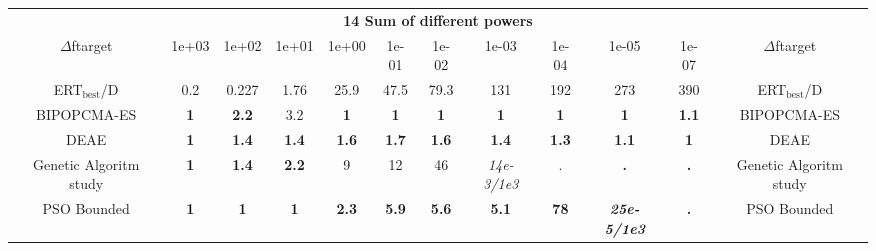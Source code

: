 \begin{tabular}{cccccccccccc}
 & \multicolumn{10}{c}{{\normalsize \textbf{14 Sum of different powers}}}\\
$\Delta$ftarget& 1e+03& 1e+02& 1e+01& 1e+00& 1e-01& 1e-02& 1e-03& 1e-04& 1e-05& 1e-07 & $\Delta$ftarget \\
ERT$_{\textrm{best}}$/D& 0.2& 0.227& 1.76& 25.9& 47.5& 79.3& 131& 192& 273& 390 & ERT$_{\textrm{best}}$/D \\
\hline
BIPOPCMA-ES & \textbf{1} & \textbf{2.2} & 3.2 & \textbf{1} & \textbf{1} & \textbf{1} & \textbf{1} & \textbf{1} & \textbf{1} & \textbf{1.1} & BIPOPCMA-ES \cite{add_an_entry_for_BIPOPCMA-ES_in_bbob.bib}\\
DEAE & \textbf{1} & \textbf{1.4} & \textbf{1.4} & \textbf{1.6} & \textbf{1.7} & \textbf{1.6} & \textbf{1.4} & \textbf{1.3} & \textbf{1.1} & \textbf{1} & DEAE \cite{add_an_entry_for_DEAE_in_bbob.bib}\\
Genetic Algoritm study & \textbf{1} & \textbf{1.4} & \textbf{2.2} & 9 & 12 & 46 & \textit{14e-3}\textit{/1e3} & . & \textbf{.} & \textbf{.} & Genetic Algoritm study \cite{add_an_entry_for_Genetic Algoritm study_in_bbob.bib}\\
PSO Bounded & \textbf{1} & \textbf{1} & \textbf{1} & \textbf{2.3} & \textbf{5.9} & \textbf{5.6} & \textbf{5.1} & \textbf{78} & \textbf{\textit{25e-5}\textit{/1e3}} & \textbf{.} & PSO Bounded \cite{add_an_entry_for_PSO Bounded_in_bbob.bib}
\end{tabular}
